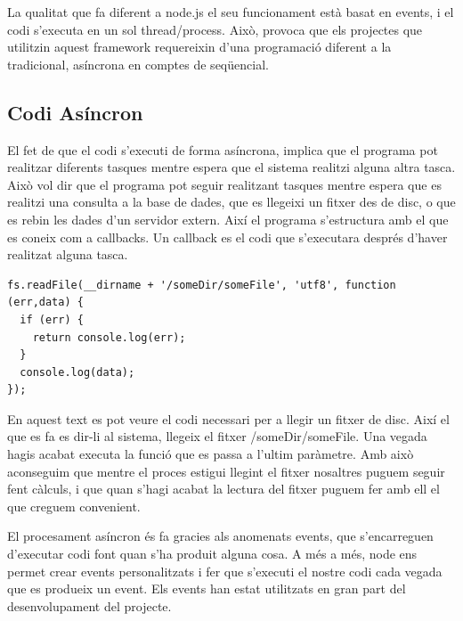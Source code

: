 La qualitat que fa diferent a node.js el seu funcionament està basat en events, i el codi s'executa en un sol thread/process. Això, provoca que els projectes que utilitzin aquest framework requereixin d'una programació diferent a la tradicional, asíncrona en comptes de seqüencial. 

\subsection{Codi Asíncron}

El fet de que el codi s'executi de forma asíncrona, implica que el programa pot realitzar diferents tasques mentre espera que el sistema realitzi alguna altra tasca. Això vol dir que el programa pot seguir realitzant tasques mentre espera que es realitzi una consulta a la base de dades, que es llegeixi un fitxer des de disc, o que es rebin les dades d'un servidor extern. Així el programa s'estructura amb el que es coneix com a callbacks. Un callback es el codi que s'executara després d'haver realitzat alguna tasca. 

\begin{lstlisting}
fs.readFile(__dirname + '/someDir/someFile', 'utf8', function (err,data) {
  if (err) {
    return console.log(err);
  }
  console.log(data);
});
\end{lstlisting}

En aquest text es pot veure el codi necessari per a llegir un fitxer de disc. Així el que es fa es dir-li al sistema, llegeix el fitxer /someDir/someFile. Una vegada hagis acabat executa la funció que es passa a l'ultim paràmetre. Amb això aconseguim que mentre el proces estigui llegint el fitxer nosaltres puguem seguir fent càlculs, i que quan s'hagi acabat la lectura del fitxer puguem fer amb ell el que creguem convenient. 

El procesament asíncron és fa gracies als anomenats events, que s'encarreguen d'executar codi font quan s'ha produit alguna cosa. A més a més, node ens permet crear events personalitzats i fer que s'executi el nostre codi cada vegada que es produeix un event. Els events han estat utilitzats en gran part del desenvolupament del projecte. 

